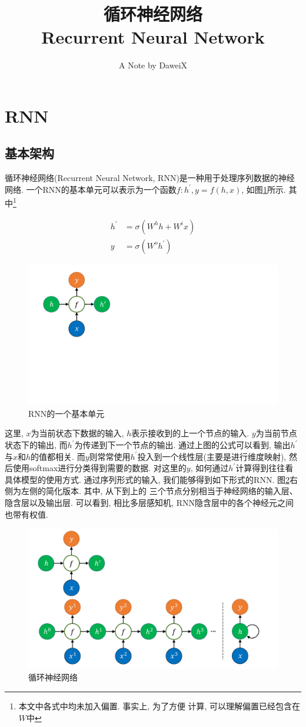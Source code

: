 \documentclass[UTF8, twocolumn]{ctexart}
\newcommand{\mytitle}{循环神经网络\\Recurrent Neural Network}
\begin{document}
\title{\mytitle}
\author{A Note by DaweiX}
\date{}
\maketitle

\section{RNN}

\subsection{基本架构}
循环神经网络(Recurrent Neural Network, RNN)是一种用于处理序列数据的神经网络. 
一个RNN的基本单元可以表示为一个函数$f:h^{\prime}, y = f(h, x)$, 
如图\ref{rnn1}所示. 其中\footnote{本文中各式中均未加入偏置. 事实上, 为了方便
计算, 可以理解偏置已经包含在$W$中}

\begin{align}
h^{\prime} &= \sigma(W^h h + W^i x)\\
y &= \sigma(W^o h^{\prime})
\end{align}


\begin{figure}[!hbt]
    \center
    \includegraphics[width=.3\linewidth]{rnn1.pdf}
    \caption{RNN的一个基本单元}
    \label{rnn1}
\end{figure}

这里, $x$为当前状态下数据的输入, $h$表示接收到的上一个节点的输入. 
$y$为当前节点状态下的输出, 而$h^{\prime}$为传递到下一个节点的输出. 
通过上图的公式可以看到, 输出$h^{\prime}$与$x$和$h$的值都相关. 
而$y$则常常使用$h^{\prime}$投入到一个线性层(主要是进行维度映射), 
然后使用softmax进行分类得到需要的数据. 对这里的$y$, 
如何通过$h^{\prime}$计算得到往往看具体模型的使用方式. 通过序列形式的输入, 
我们能够得到如下形式的RNN. 图\ref{rnn2}右侧为左侧的简化版本. 其中, 从下到上的
三个节点分别相当于神经网络的输入层、隐含层以及输出层. 可以看到, 相比多层感知机, 
RNN隐含层中的各个神经元之间也带有权值. 


\begin{figure}[!hbt]
    \center
    \includegraphics[width=\linewidth]{rnn2.pdf}
    \caption{循环神经网络}
    \label{rnn2}
\end{figure}
\end{document}
